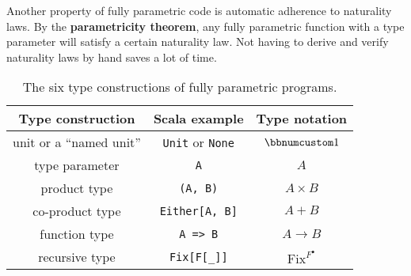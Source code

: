 Another property of fully parametric code is automatic adherence to
naturality laws. By the \textbf{parametricity theorem},
any fully parametric function with a type parameter will satisfy a
certain naturality law. Not having to derive and verify naturality
laws by hand saves a lot of time.

\begin{wraptable}{l}{0.58\columnwidth}%
\begin{centering}
\vspace{-0.2\baselineskip}
\begin{tabular}{|c|c|c|}
\hline 
\textbf{\small{}Type construction} & \textbf{\small{}Scala example} & \textbf{\small{}Type notation}\tabularnewline
\hline 
\hline 
{\small{}unit or a \textsf{``}named unit\textsf{''}} & {\small{}}\lstinline!Unit!{\small{} or }\lstinline!None!{\small{} } & {\small{}$\bbnum 1$}\tabularnewline
\hline 
{\small{}type parameter} & {\small{}}\lstinline!A! & {\small{}$A$}\tabularnewline
\hline 
{\small{}product type} & {\small{}}\lstinline!(A, B)! & {\small{}$A\times B$}\tabularnewline
\hline 
{\small{}co-product type} & {\small{}}\lstinline!Either[A, B]! & {\small{}$A+B$}\tabularnewline
\hline 
{\small{}function type} & {\small{}}\lstinline!A => B! & {\small{}$A\rightarrow B$}\tabularnewline
\hline 
{\small{}recursive type} & {\small{}}\lstinline!Fix[F[_]]! & {\small{}$\text{Fix}^{F^{\bullet}}$}\tabularnewline
\hline 
\end{tabular}
\par\end{centering}
\caption{The six type constructions
of fully parametric programs.\label{tab:six-pure-type-constructions}}
\vspace{-0.2\baselineskip}
\end{wraptable}%

